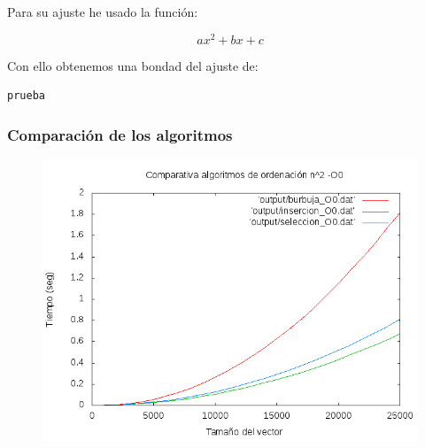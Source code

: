 \documentclass[spanish]{beamer}
\begin{document}
\begin{frame}[fragile]
  Para su ajuste he usado la función:

  $$ax^2+bx+c$$

  Con ello obtenemos una bondad del ajuste de:
  
\begin{verbatim}
prueba
\end{verbatim}
  
\end{frame}

%
%

\begin{frame}\frametitle{Comparación de los algoritmos}
  \begin{figure}[H]
    \centering   
        \includegraphics[clip,width=1\columnwidth]{../../plots/cuadraticos_O0.png}%
    \end{figure}
  \end{frame}
\end{document}
